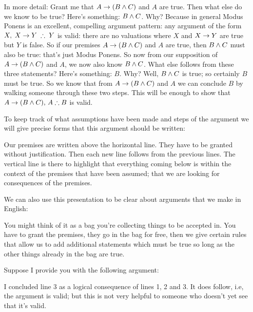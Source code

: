 In more detail:
Grant me that $A\rightarrow (B\mathbin{\wedge} C)$ and $A$ are true. Then what else do we know to be true? Here's something: $B\mathbin{\wedge} C$. Why? Because in general Modus Ponens is an excellent, compelling argument pattern: any argument of the form $X,\;X\eif Y\;\therefore\;Y$ is valid: there are no valuations where $X$ and $X\rightarrow Y$ are true but $Y$ is false. So if our premises  $A\rightarrow (B\mathbin{\wedge} C)$ and $A$ are true, then $B\mathbin{\wedge} C$ must also be true: that's just Modus Ponens. So now from our supposition of $A\rightarrow(B\mathbin{\wedge} C)$ and $A$, we now also know $B\mathbin{\wedge} C$. What else follows from these three statements? Here's something: $B$. Why? Well, $B\mathbin{\wedge} C$ is true; so certainly $B$ must be true. So we know that from $A\rightarrow(B\mathbin{\wedge} C)$ and $A$ we can conclude $B$ by walking someone through these two steps. This will be enough to show that $A\eif(B\eand C),\,A\therefore B$ is valid.

To keep track of what assumptions have been made and steps of the argument we will give precise forms that this argument should be written:
\begin{fitchproof}
\end{fitchproof}
Our premises are written above the horizontal line. They have to be granted without justification. Then each new line follows from the previous lines. The vertical line is there to highlight that everything coming below is within the context of the premises that have been assumed; that we are looking for consequences of the premises.

We can also use this presentation to be clear about arguments that we make in English:
\begin{fitchproof}
\end{fitchproof}

You might think of it as a bag you're collecting things to be accepted in. You have to grant the premises, they go in the bag for free, then we give certain rules that allow us to add additional statements which must be true so long as the other things already in the bag are true.


Suppose I provide you with the following argument:
\begin{fitchproof}
\end{fitchproof}
I concluded line 3 as a logical consequence of lines 1, 2 and 3. It does follow, i.e, the argument is valid; but this is not very helpful to someone who doesn't yet see that it's valid.

